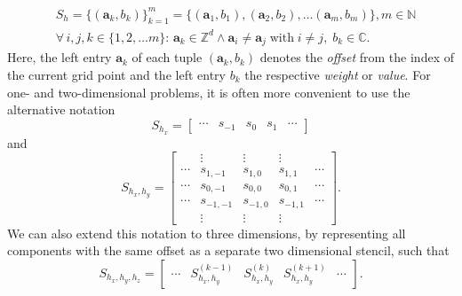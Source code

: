 \begin{equation}
	\begin{split}
			& S_h = \{(\bm{a}_k, b_k) \}_{k=1}^m = \{(\bm{a}_1, b_1),  (\bm{a}_2, b_2), \dots (\bm{a}_m, b_m)\}, m \in \mathbb{N}
	\\ & \forall \, i, j, k \in \{1, 2, \dots m \}: \,
	\bm{a}_k \in \mathbb{Z}^d \wedge \bm{a}_i \neq \bm{a}_j \; \text{with} \; i \neq j, \; b_k \in \mathbb{C}.
	\end{split}
\end{equation}
Here, the left entry $\bm{a}_k$ of each tuple $(\bm{a}_k, b_k)$ denotes the \emph{offset} from the index of the current grid point and the left entry $b_k$ the respective \emph{weight} or \emph{value}.
For one- and two-dimensional problems, it is often more convenient to use the alternative notation 
\begin{equation}
	S_{h_x} = \begin{bmatrix}
		\cdots & s_{-1} & s_{0} & s_{1} & \cdots
	\end{bmatrix}
\end{equation}
and
\begin{equation}
	S_{h_x, h_y} = \begin{bmatrix}
		& \vdots & \vdots & \vdots & \\
		\cdots & s_{1,-1} & s_{1,0} & s_{1,1} & \cdots \\
		\cdots & s_{0,-1} & s_{0,0} & s_{0,1} & \cdots \\
		\cdots & s_{-1,-1} & s_{-1,0} & s_{-1,1} & \cdots \\
		& \vdots & \vdots & \vdots &
	\end{bmatrix}.
\end{equation}
We can also extend this notation to three dimensions, by representing all components with the same offset as a separate two dimensional stencil, such that
\begin{equation}
	S_{h_x, h_y, h_z} = 
	\begin{bmatrix}
		\cdots & S_{h_x, h_y}^{(k-1)} & S_{h_x, h_y}^{(k)} & S_{h_x, h_y}^{(k+1)} & \cdots 
	\end{bmatrix}.
\label{eq:3D-stencil-matrix-notation}
\end{equation}

